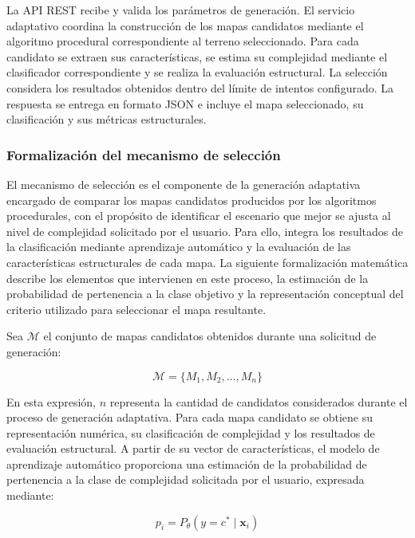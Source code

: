 La API REST recibe y valida los parámetros de generación. El servicio adaptativo coordina la construcción de los mapas candidatos mediante el algoritmo procedural correspondiente al terreno seleccionado. Para cada candidato se extraen sus características, se estima su complejidad mediante el clasificador correspondiente y se realiza la evaluación estructural. La selección considera los resultados obtenidos dentro del límite de intentos configurado. La respuesta se entrega en formato JSON e incluye el mapa seleccionado, su clasificación y sus métricas estructurales.

\subsubsection{Formalización del mecanismo de selección}
\label{subsubsec:formalizacion_seleccion}

El mecanismo de selección es el componente de la generación adaptativa encargado de comparar los mapas candidatos producidos por los algoritmos procedurales, con el propósito de identificar el escenario que mejor se ajusta al nivel de complejidad solicitado por el usuario. Para ello, integra los resultados de la clasificación mediante aprendizaje automático y la evaluación de las características estructurales de cada mapa. La siguiente formalización matemática describe los elementos que intervienen en este proceso, la estimación de la probabilidad de pertenencia a la clase objetivo y la representación conceptual del criterio utilizado para seleccionar el mapa resultante.

Sea $\mathcal{M}$ el conjunto de mapas candidatos obtenidos durante una solicitud de generación:

\begin{equation}
	\mathcal{M} = \{M_1,M_2,\ldots,M_n\}
	\label{eq:conjunto_candidatos}
\end{equation}

En esta expresión, $n$ representa la cantidad de candidatos considerados durante el proceso de generación adaptativa. Para cada mapa candidato se obtiene su representación numérica, su clasificación de complejidad y los resultados de evaluación estructural. A partir de su vector de características, el modelo de aprendizaje automático proporciona una estimación de la probabilidad de pertenencia a la clase de complejidad solicitada por el usuario, expresada mediante:

\begin{equation}
	p_i = P_{\theta}(y=c^{*}\mid\mathbf{x}_i)
	\label{eq:probabilidad_clase_objetivo}
\end{equation}

